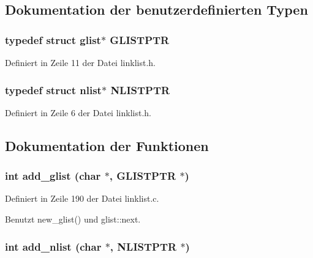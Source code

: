 \subsection{Dokumentation der benutzerdefinierten Typen}
\subsubsection{\setlength{\rightskip}{0pt plus 5cm}typedef struct {\bf glist}$\ast$ {\bf GLISTPTR}}\label{linklist_8h_8ba38064a5a49a77b788338c8aab0ce9}




Definiert in Zeile 11 der Datei linklist.h.
\subsubsection{\setlength{\rightskip}{0pt plus 5cm}typedef struct {\bf nlist}$\ast$ {\bf NLISTPTR}}\label{linklist_8h_a24a845f5406aa82c81d3d1b74fa7c87}




Definiert in Zeile 6 der Datei linklist.h.

\subsection{Dokumentation der Funktionen}
\subsubsection{\setlength{\rightskip}{0pt plus 5cm}int add\_\-glist (char $\ast$, {\bf GLISTPTR} $\ast$)}\label{linklist_8h_a17a4a0e1bebcb1f19644843920ef3ea}




Definiert in Zeile 190 der Datei linklist.c.

Benutzt new\_\-glist() und glist::next.
\subsubsection{\setlength{\rightskip}{0pt plus 5cm}int add\_\-nlist (char $\ast$, {\bf NLISTPTR} $\ast$)}\label{linklist_8h_5ff4c7ffc3201d64048a6921c866c937}




